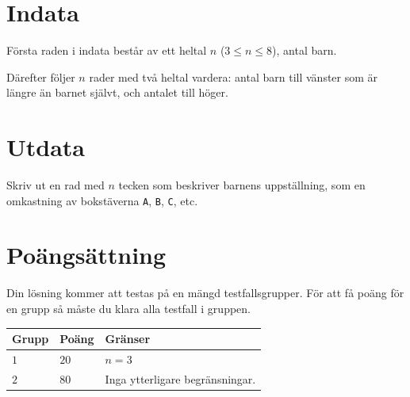 \section*{Indata}
Första raden i indata består av ett heltal $n$ ($3 \le n \le 8$), antal barn.

Därefter följer $n$ rader med två heltal vardera: antal barn till vänster som är längre än barnet självt, och antalet till höger.

\section*{Utdata}
Skriv ut en rad med $n$ tecken som beskriver barnens uppställning, som en omkastning av bokstäverna \texttt{A}, \texttt{B}, \texttt{C}, etc.

\section*{Poängsättning}
Din lösning kommer att testas på en mängd testfallsgrupper.
För att få poäng för en grupp så måste du klara alla testfall i gruppen.


\noindent
\begin{tabular}{| l | l | p{12cm} |}
  \hline
  \textbf{Grupp} & \textbf{Poäng} & \textbf{Gränser} \\ \hline
  $1$    & $20$       & $n = 3$ \\ \hline
  $2$    & $80$       & Inga ytterligare begränsningar. \\ \hline
\end{tabular}
